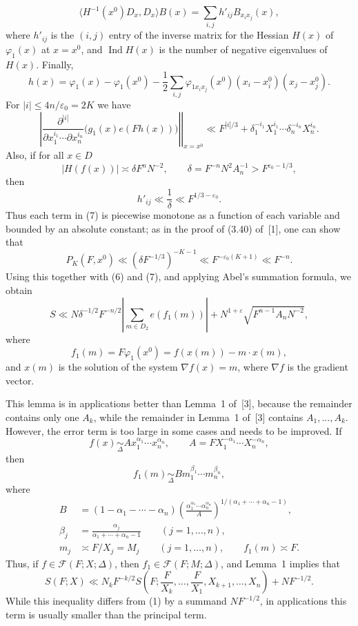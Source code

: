 \documentclass[10pt]{article}
\begin{document}
\[
  \langle H^{-1}(x^0)D_x,D_x\rangle B(x)
  =\sum_{i,j}h'_{ij}B_{x_ix_j}(x),
\]
where $h'_{ij}$ is the $(i,j)$ entry of the inverse matrix for the Hessian $H(x)$ of $\varphi_1(x)$ at $x=x^0$, and $\operatorname{Ind}H(x)$ is the number of negative eigenvalues of $H(x)$. Finally,
\[
  h(x)=\varphi_1(x)-\varphi_1(x^0)
  -\frac12\sum_{i,j}\varphi_{1x_ix_j}(x^0)(x_i-x_i^0)(x_j-x_j^0).
\]
For $|i|\leqslant4n/\varepsilon_0=2K$ we have
\[
  \left.
  \left|\frac{\partial^{|i|}}
  {\partial x_1^{i_1}\cdots\partial x_n^{i_n}}
  \bigl(g_1(x)e(Fh(x))\bigr)\right|\right|_{x=x^0}
  \ll F^{|i|/3}+\delta_1^{-i_1}X_1^{i_1}\cdots\delta_n^{-i_n}X_n^{i_n}.
\]
Also, if for all $x\in D$
\[
  |H(f(x))|\asymp\delta F^nN^{-2},
  \qquad
  \delta=F^{-n}N^2A_n^{-1}>F^{\varepsilon_0-1/3},
\]
then
\[
  h'_{ij}\ll\frac1\delta\ll F^{1/3-\varepsilon_0}.
\]
Thus each term in (7) is piecewise monotone as a function of each variable and bounded by an absolute constant; as in the proof of (3.40) of~[1], one can show that
\[
  P_K(F,x^0)\ll(\delta F^{-1/3})^{-K-1}
  \ll F^{-\varepsilon_0(K+1)}\ll F^{-n}.
\]
Using this together with (6) and (7), and applying Abel's summation formula, we obtain
\[
  S\ll N\delta^{-1/2}F^{-n/2}
  \left|\sum_{m\in D_2}e(f_1(m))\right|
  +N^{1+\varepsilon}\sqrt{F^{n-1}A_nN^{-2}},
\]
where
\[
  f_1(m)=F\varphi_1(x^0)=f(x(m))-m\cdot x(m),
\]
and $x(m)$ is the solution of the system $\nabla f(x)=m$, where $\nabla f$ is the gradient vector.

This lemma is in applications better than Lemma~1 of~[3], because the remainder contains only one $A_k$, while the remainder in Lemma~1 of~[3] contains $A_1,\ldots,A_k$. However, the error term is too large in some cases and needs to be improved. If
\[
  f(x)\underset{\Delta}{\sim}Ax_1^{\alpha_1}\cdots x_n^{\alpha_n},
  \qquad
  A=FX_1^{-\alpha_1}\cdots X_n^{-\alpha_n},
\]
then
\[
  f_1(m)\underset{\Delta}{\sim}Bm_1^{\beta_1}\cdots m_n^{\beta_n},
\]
where
\[
\begin{aligned}
  B&=(1-\alpha_1-\cdots-\alpha_n)
  \left(\frac{\alpha_1^{\alpha_1}\cdots\alpha_n^{\alpha_n}}A\right)^{1/(\alpha_1+\cdots+\alpha_n-1)},\\
  \beta_j&=\frac{\alpha_j}{\alpha_1+\cdots+\alpha_n-1}\qquad(j=1,\ldots,n),\\
  m_j&\asymp F/X_j=M_j\qquad(j=1,\ldots,n),
  \qquad f_1(m)\asymp F.
\end{aligned}
\]
Thus, if $f\in\mathscr F(F;X;\Delta)$, then $f_1\in\mathscr F(F;M;\Delta)$, and Lemma~1 implies that
\[
  S(F;X)\ll N_kF^{-k/2}
  S\left(F;\frac F{X_k},\ldots,\frac F{X_1},X_{k+1},\ldots,X_n\right)
  +NF^{-1/2}.
\]
While this inequality differs from (1) by a summand $NF^{-1/2}$, in applications this term is usually smaller than the principal term.
\end{document}
